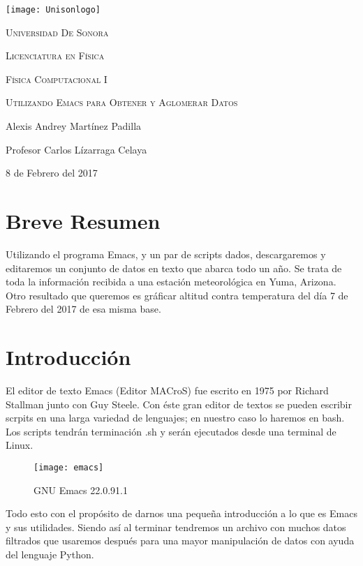 \documentclass[12pt,a4paper]{article}
\begin{document}
\begin{titlepage}
	\centering
	\texttt{[image: Unisonlogo]}\par
    \vspace{1cm}
	\scshape \LARGE Universidad De Sonora \par
	\vspace{1cm}
	\scshape \Large Licenciatura en Física\par
    \scshape \Large Física Computacional I \par
	\vspace{1.5cm}
	\huge \scshape Utilizando Emacs para Obtener y Aglomerar Datos\par
	\vspace{2cm}
	\Large Alexis Andrey Martínez Padilla\par
    \vspace{1cm}
    \Large Profesor Carlos Lízarraga Celaya\par
    \vspace{1cm}
    \Large 8 de Febrero del 2017
\end{titlepage}

\section{Breve Resumen}
    Utilizando el programa Emacs, y un par de scripts dados, descargaremos y editaremos un conjunto de datos en texto que abarca todo un año. Se trata de toda la información recibida a una estación meteorológica en Yuma, Arizona. Otro resultado que queremos es gráficar altitud contra temperatura del día 7 de Febrero del 2017 de esa misma base.

\section{Introducción}
El editor de texto Emacs (Editor MACroS) fue escrito en 1975 por Richard Stallman junto con Guy Steele. Con éste gran editor de textos se pueden escribir scrpits en una larga variedad de lenguajes; en nuestro caso lo haremos en bash. Los scripts tendrán terminación .sh y serán ejecutados desde una terminal de Linux. \\

\begin{figure}[h]
\centering
\texttt{[image: emacs]}
\caption{GNU Emacs 22.0.91.1\label{overflow}}
\end{figure}

Todo esto con el propósito de darnos una pequeña introducción a lo que es Emacs y sus utilidades. Siendo así al terminar tendremos un archivo con muchos datos filtrados que usaremos después para una mayor manipulación de datos con ayuda del lenguaje Python.
\end{document}
